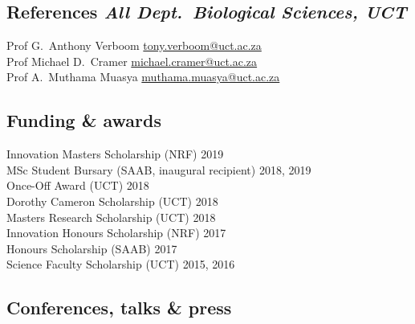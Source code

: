\documentclass[10pt]{article}
\begin{document}
\begin{multicols}{2}
\subsection*{References %
           \hfill {\small \textmd{\textit{All Dept.~Biological Sciences, UCT}}}}

Prof G.~Anthony Verboom
      \hfill     \href{mailto:tony.verboom@uct.ac.za}{tony.verboom@uct.ac.za} \\
Prof Michael D.~Cramer
      \hfill \href{mailto:michael.cramer@uct.ac.za}{michael.cramer@uct.ac.za} \\
Prof A.~Muthama Muasya
      \hfill \href{mailto:muthama.muasya@uct.ac.za}{muthama.muasya@uct.ac.za} \\

\subsection*{Funding \& awards} %

Innovation Masters Scholarship {\small  (NRF)}     \hfill {\small       2019} \\
MSc Student Bursary            {\small (SAAB, inaugural recipient)}
                                                   \hfill {\small 2018, 2019} \\
Once-Off Award                 {\small  (UCT)}     \hfill {\small       2018} \\
Dorothy Cameron Scholarship    {\small  (UCT)}     \hfill {\small       2018} \\
Masters Research Scholarship   {\small  (UCT)}     \hfill {\small       2018} \\
Innovation Honours Scholarship {\small  (NRF)}     \hfill {\small       2017} \\
Honours Scholarship            {\small (SAAB)}     \hfill {\small       2017} \\
Science Faculty Scholarship    {\small  (UCT)}     \hfill {\small 2015, 2016}

\subsection*{Conferences, talks \& press} %


\end{multicols}
\end{document}
